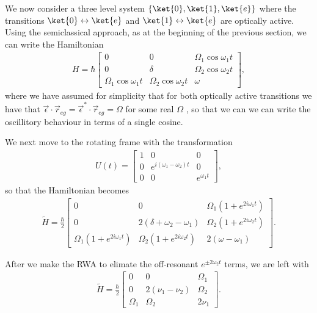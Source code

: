 We now consider a three level system $\{\ket{0}, \ket{1}, \ket{e}\}$ where the transitions $\ket{0} \leftrightarrow \ket{e}$ and $\ket{1} \leftrightarrow \ket{e}$ are optically active. Using the semiclassical approach, as at the beginning of the previous section, we can write the Hamiltonian
\begin{align}
  H=\hbar
  \begin{bmatrix}
    0 & 0 & \Omega_1 \cos\omega_1 t \\
    0 & \delta & \Omega_2 \cos\omega_2 t \\
    \Omega_1 \cos\omega_1 t & \Omega_2 \cos\omega_2 t & \omega
  \end{bmatrix},
\end{align}
where we have assumed for simplicity that for both optically active transitions we have that $\vec{\epsilon}\cdot \vec{r}_{eg} = \vec{\epsilon}^*\cdot \vec{r}_{eg} = \Omega$ for some real $\Omega$ , so that we can we can write the oscillitory behaviour in terms of a single cosine.

We next move to the rotating frame with the transformation
\begin{align}
  U(t) = 
  \begin{bmatrix}
    1 & 0 & 0 \\
    0 & e^{i(\omega_1 - \omega_2)t} & 0 \\
    0 & 0 & e^{\omega_1 t}
  \end{bmatrix},
\end{align}
so that the Hamiltonian becomes
\begin{align}
  \tilde{H}=\frac{\hbar}{2}
  \begin{bmatrix}
    0 & 0 & \Omega_1(1+e^{2i\omega_1 t}) \\
    0 & 2(\delta + \omega_2 - \omega_1) & \Omega_2 (1+e^{2i\omega_2 t}) \\
    \Omega_1(1+e^{2i\omega_1 t}) & \Omega_2 (1+e^{2i\omega_2 t}) & 2(\omega - \omega_1)
  \end{bmatrix}.
\end{align}

After we make the RWA to elimate the off-resonant $e^{\pm2\omega_2 t}$ terms, we are left with 
\begin{align}
  \tilde{H}=\frac{\hbar}{2}
  \begin{bmatrix}
    0 & 0 & \Omega_1 \\
    0 & 2(\nu_1 - \nu_2) & \Omega_2  \\
    \Omega_1 & \Omega_2  & 2\nu_1
  \end{bmatrix}.
\end{align}

